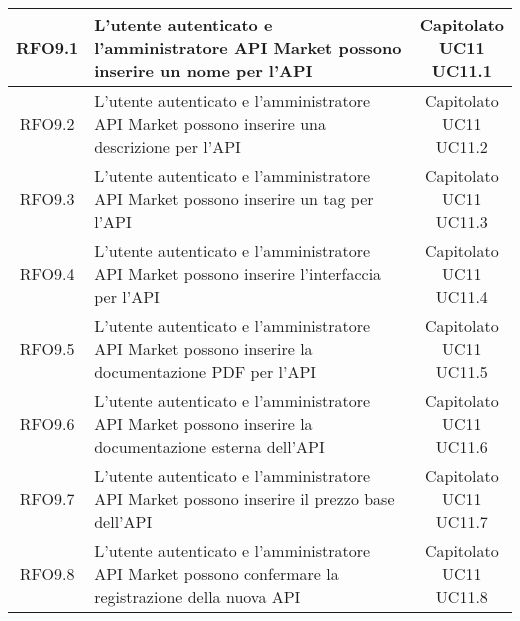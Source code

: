 \begin{longtable}{|c|p{8cm}|c|}
\hypertarget{RFO9.1}{RFO9.1} &  L'utente autenticato e l'amministratore API Market possono inserire un nome per l'API & \makecell*{Capitolato\\UC11\\UC11.1} \\
\hline

\hypertarget{RFO9,2}{RFO9.2} &  L'utente autenticato e l'amministratore API Market possono inserire una descrizione per l'API & \makecell*{Capitolato\\UC11\\UC11.2} \\
\hline

\hypertarget{RFO9.3}{RFO9.3} &  L'utente autenticato e l'amministratore API Market possono inserire un tag per l'API & \makecell*{Capitolato\\UC11\\UC11.3} \\
\hline

\hypertarget{RFO9.4}{RFO9.4} &  L'utente autenticato e l'amministratore API Market possono inserire l'interfaccia per l'API & \makecell*{Capitolato\\UC11\\UC11.4} \\
\hline

\hypertarget{RFO9.5}{RFO9.5} &  L'utente autenticato e l'amministratore API Market possono inserire la documentazione PDF per l'API & \makecell*{Capitolato\\UC11\\UC11.5} \\
\hline

\hypertarget{RFO9.6}{RFO9.6} &  L'utente autenticato e l'amministratore API Market possono inserire la documentazione esterna dell'API & \makecell*{Capitolato\\UC11\\UC11.6} \\
\hline

\hypertarget{RFO9.7}{RFO9.7} &  L'utente autenticato e l'amministratore API Market possono inserire il prezzo base dell'API & \makecell*{Capitolato\\UC11\\UC11.7} \\
\hline

\hypertarget{RFO9.8}{RFO9.8} & L'utente autenticato e l'amministratore API Market possono confermare la registrazione della nuova API & \makecell*{Capitolato\\UC11\\UC11.8} \\
\hline


\end{longtable}
